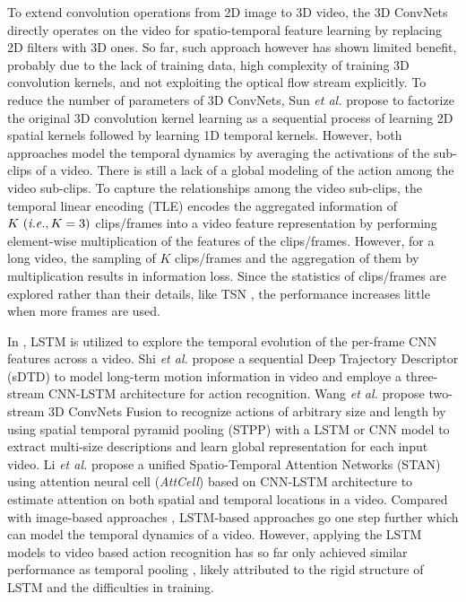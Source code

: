 \documentclass[english, 10pt, twocolumn, twoside]{IEEEtran}
\begin{document}
To extend convolution operations from 2D image to 3D video, the 3D ConvNets \cite{tran2015learning} directly operates on the video for spatio-temporal feature learning by replacing 2D filters with 3D ones. So far, such approach however has shown limited benefit, probably due to the lack of training data, high complexity of training 3D convolution kernels, and not exploiting the optical flow stream explicitly. To reduce the number of parameters of 3D ConvNets, Sun \emph{et al.} \cite{sun2015human} propose to factorize the original 3D convolution kernel learning as a sequential process of learning 2D spatial kernels followed by learning 1D temporal kernels. However, both approaches model the temporal dynamics by averaging the activations of the sub-clips of a video. There is still a lack of a global modeling of the action among the video sub-clips. To capture the relationships among the video sub-clips, the temporal linear encoding (TLE) \cite{diba2016deep} encodes the aggregated information of $K ~(\emph{i.e.}, K=3)$ clips/frames into a video feature representation by performing element-wise multiplication of the features of the clips/frames. However, for a long video, the sampling of $K$ clips/frames and the aggregation of them by multiplication results in information loss. Since the statistics of clips/frames are explored rather than their details, like TSN \cite{wang2016temporal}, the performance increases little when more frames are used.

In \cite{yue2015beyond,donahue2015long,sharma2015actionattention,li2016videolstm}, LSTM is utilized to explore the temporal evolution of the per-frame CNN features across a video. Shi \emph{et al.} \cite{shi2017sequential} propose a sequential Deep Trajectory Descriptor (sDTD) to model long-term motion information in video and employe a three-stream CNN-LSTM architecture for action recognition. Wang \emph{et al.} \cite{wang2018two-stream} propose two-stream 3D ConvNets Fusion to recognize actions of arbitrary size and length by using spatial temporal pyramid pooling (STPP) with a LSTM or CNN model to extract multi-size descriptions and learn global representation for each input video. Li \emph{et al.} \cite{LiUnified} propose a unified Spatio-Temporal Attention Networks (STAN) using attention neural cell (\emph{AttCell}) based on CNN-LSTM architecture to estimate attention on both spatial and temporal locations in a video. Compared with image-based approaches \cite{simonyan2014two,wang2016temporal}, LSTM-based approaches go one step further which can model the temporal dynamics of a video. However, applying the LSTM models to video based action recognition has so far only achieved similar performance as temporal pooling \cite{yue2015beyond}, likely attributed to the rigid structure of LSTM and the difficulties in training.
\end{document}
